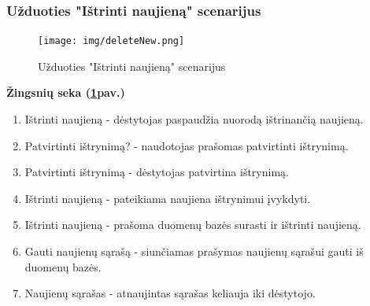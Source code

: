 \documentclass{VUMIFPSkursinis}
\begin{document}
\subsubsection{Užduoties "Ištrinti naujieną" scenarijus}
\begin{figure}[H]
	\centering
	\texttt{[image: img/deleteNew.png]}
	\caption{Užduoties "Ištrinti naujieną" scenarijus}
	\label{fig:delNew}
\end{figure}
\textbf{Žingsnių seka (\ref{fig:delNew}pav.)}\\
\begin{enumerate}
	\item Ištrinti naujieną - dėstytojas paspaudžia nuorodą ištrinančią naujieną.
	\item Patvirtinti ištrynimą? - naudotojas prašomas patvirtinti ištrynimą.
	\item Patvirtinti ištrynimą - dėstytojas patvirtina ištrynimą.
	\item Ištrinti naujieną - pateikiama naujiena ištrynimui įvykdyti.
	\item Ištrinti naujieną - prašoma duomenų bazės surasti ir ištrinti naujieną.
	\item Gauti naujienų sąrašą - siunčiamas prašymas naujienų sąrašui gauti iš duomenų bazės.
	\item Naujienų sąrašas - atnaujintas sąrašas keliauja iki dėstytojo.
\end{enumerate}
\end{document}
